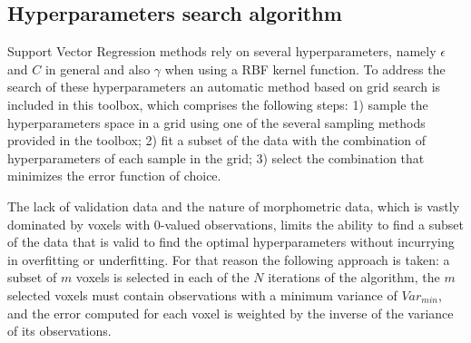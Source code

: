 \documentclass{article}
\begin{document}
\subsection{Hyperparameters search algorithm}

Support Vector Regression methods rely on several hyperparameters, namely $\epsilon$ and $C$ in general and also $\gamma$ when using a RBF kernel function. To address the search of these hyperparameters an automatic method based on grid search is included in this toolbox, which comprises the following steps: 1) sample the hyperparameters space in a grid using one of the several sampling methods provided in the toolbox; 2) fit a subset of the data with the combination of hyperparameters of each sample in the grid; 3) select the combination that minimizes the error function of choice. 

The lack of validation data and the nature of morphometric data, which is vastly dominated by voxels with 0-valued observations, limits the ability to find a subset of the data that is valid to find the optimal hyperparameters without incurrying in overfitting or underfitting. For that reason the following approach is taken: a subset of $m$ voxels is selected in each of the $N$ iterations of the algorithm, the $m$ selected voxels must contain observations with a minimum variance of $Var_{min}$, and the error computed for each voxel is weighted by the inverse of the variance of its observations. 
\end{document}
